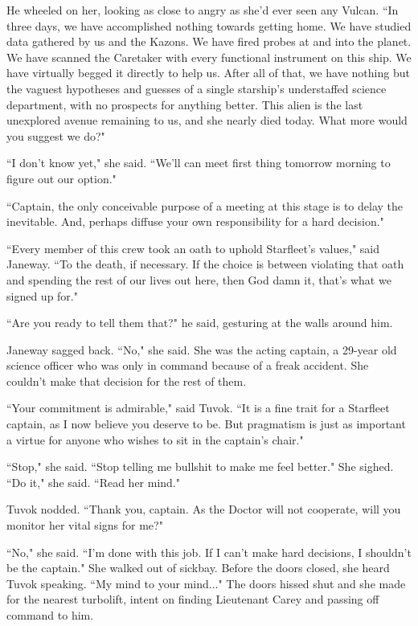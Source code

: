 \documentclass[twoside,letterpaper,12pt]{memoir}
\begin{document}
He wheeled on her, looking as close to angry as she'd ever seen any Vulcan. ``In three days, we have accomplished nothing towards getting home. We have studied data gathered by us and the Kazons. We have fired probes at and into the planet. We have scanned the Caretaker with every functional instrument on this ship. We have virtually begged it directly to help us. After all of that, we have nothing but the vaguest hypotheses and guesses of a single starship's understaffed science department, with no prospects for anything better. This alien is the last unexplored avenue remaining to us, and she nearly died today. What more would you suggest we do?" 

``I don't know yet," she said. ``We'll can meet first thing tomorrow morning to figure out our option." 

``Captain, the only conceivable purpose of a meeting at this stage is to delay the inevitable. And, perhaps diffuse your own responsibility for a hard decision." 

``Every member of this crew took an oath to uphold Starfleet's values," said Janeway. ``To the death, if necessary. If the choice is between violating that oath and spending the rest of our lives out here, then God damn it, that's what we signed up for." 

``Are you ready to tell them that?" he said, gesturing at the walls around him. 

Janeway sagged back. ``No," she said. She was the acting captain, a 29-year old science officer who was only in command because of a freak accident. She couldn't make that decision for the rest of them. 

``Your commitment is admirable," said Tuvok. ``It is a fine trait for a Starfleet captain, as I now believe you deserve to be. But pragmatism is just as important a virtue for anyone who wishes to sit in the captain's chair." 

``Stop," she said. ``Stop telling me bullshit to make me feel better." She sighed. ``Do it," she said. ``Read her mind." 

Tuvok nodded. ``Thank you, captain. As the Doctor will not cooperate, will you monitor her vital signs for me?" 

``No," she said. ``I'm done with this job. If I can't make hard decisions, I shouldn't be the captain." She walked out of sickbay. Before the doors closed, she heard Tuvok speaking. ``My mind to your mind..." The doors hissed shut and she made for the nearest turbolift, intent on finding Lieutenant Carey and passing off command to him. 
\end{document}
